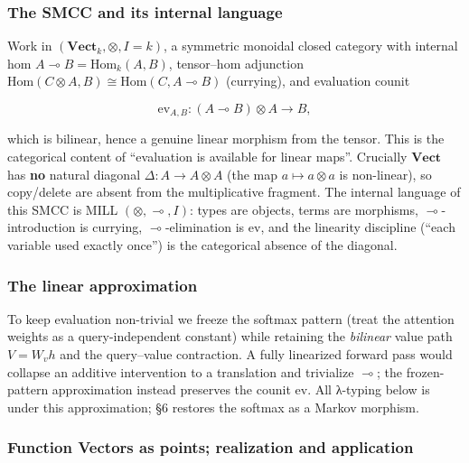 \documentclass[a4paper,11pt]{article}
\begin{document}
\hypertarget{the-smcc-and-its-internal-language}{%
\subsubsection{The SMCC and its internal
language}\label{the-smcc-and-its-internal-language}}

Work in \((\mathbf{Vect}_k,\otimes,I=k)\), a symmetric monoidal closed
category with internal hom \(A\multimap B=\mathrm{Hom}_k(A,B)\),
tensor--hom adjunction
\(\mathrm{Hom}(C\otimes A,B)\cong\mathrm{Hom}(C,A\multimap B)\)
(currying), and evaluation counit

\[\mathrm{ev}_{A,B}:(A\multimap B)\otimes A\longrightarrow B,\]

which is bilinear, hence a genuine linear morphism from the tensor. This
is the categorical content of ``evaluation is available for linear
maps''. Crucially \(\mathbf{Vect}\) has \textbf{no} natural diagonal
\(\Delta:A\to A\otimes A\) (the map \(a\mapsto a\otimes a\) is
non-linear), so copy/delete are absent from the multiplicative fragment.
The internal language of this SMCC is MILL \((\otimes,\multimap,I)\):
types are objects, terms are morphisms, \(\multimap\)-introduction is
currying, \(\multimap\)-elimination is \(\mathrm{ev}\), and the 
linearity discipline (``each variable used exactly once'') is the categorical absence of the diagonal.

\hypertarget{the-linear-approximation}{%
\subsubsection{The linear approximation}\label{the-linear-approximation}}

To keep evaluation non-trivial we freeze the softmax pattern (treat the
attention weights as a query-independent constant) while retaining the
\emph{bilinear} value path \(V=W_v h\) and the query--value contraction.
A fully linearized forward pass would collapse an additive intervention
to a translation and trivialize \(\multimap\); the frozen-pattern
approximation instead preserves the counit \(\mathrm{ev}\). All λ-typing
below is under this approximation; §6 restores the softmax as a Markov
morphism.

\hypertarget{function-vectors-as-points-realization-and-application}{%
\subsubsection{Function Vectors as points; realization and
application}\label{function-vectors-as-points-realization-and-application}}
\end{document}
